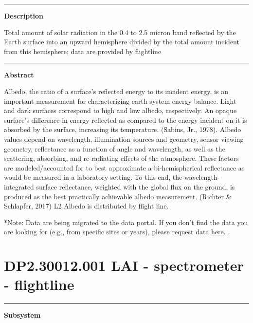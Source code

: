 \documentclass[]{article}
\begin{document}
\begin{center}\rule{0.5\linewidth}{\linethickness}\end{center}

\textbf{Description}

Total amount of solar radiation in the 0.4 to 2.5 micron band reflected
by the Earth surface into an upward hemisphere divided by the total
amount incident from this hemisphere; data are provided by flightline

\begin{center}\rule{0.5\linewidth}{\linethickness}\end{center}

\textbf{Abstract}

Albedo, the ratio of a surface's reflected energy to its incident
energy, is an important measurement for characterizing earth system
energy balance. Light and dark surfaces correspond to high and low
albedo, respectively. An opaque surface's difference in energy reflected
as compared to the energy incident on it is absorbed by the surface,
increasing its temperature. (Sabins, Jr., 1978). Albedo values depend on
wavelength, illumination sources and geometry, sensor viewing geometry,
reflectance as a function of angle and wavelength, as well as the
scattering, absorbing, and re-radiating effects of the atmosphere. These
factors are modeled/accounted for to best approximate a bi-hemispherical
reflectance as would be measured in a laboratory setting. To this end,
the wavelength-integrated surface reflectance, weighted with the global
flux on the ground, is produced as the best practically achievable
albedo measurement. (Richter \& Schlapfer, 2017) L2 Albedo is
distributed by flight line.

*Note: Data are being migrated to the data portal. If you don't find the
data you are looking for (e.g., from specific sites or years), please
request data
\href{http://www.neonscience.org/request-airborne-data}{here}. \newpage
.

\section{DP2.30012.001 LAI - spectrometer -
flightline}\label{dp2.30012.001-lai---spectrometer---flightline}

\begin{center}\rule{0.5\linewidth}{\linethickness}\end{center}

\textbf{Subsystem}
\end{document}
